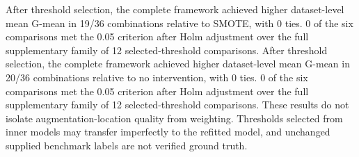 After threshold selection, the complete framework achieved higher dataset-level mean G-mean in 19/36 combinations relative to SMOTE, with 0 ties. 0 of the six comparisons met the 0.05 criterion after Holm adjustment over the full supplementary family of 12 selected-threshold comparisons.
After threshold selection, the complete framework achieved higher dataset-level mean G-mean in 20/36 combinations relative to no intervention, with 0 ties. 0 of the six comparisons met the 0.05 criterion after Holm adjustment over the full supplementary family of 12 selected-threshold comparisons.
These results do not isolate augmentation-location quality from weighting. Thresholds selected from inner models may transfer imperfectly to the refitted model, and unchanged supplied benchmark labels are not verified ground truth.
